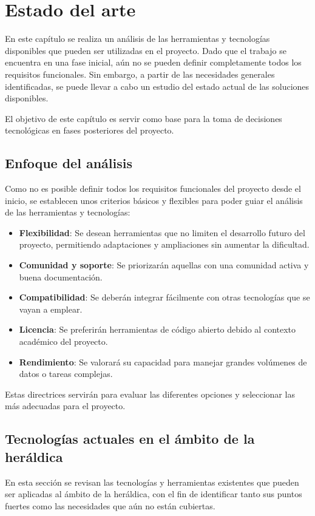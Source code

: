 \chapter{Estado del arte}

En este capítulo se realiza un análisis de las herramientas y tecnologías
disponibles que pueden ser utilizadas en el proyecto. Dado que el trabajo se 
encuentra en una fase inicial, aún no se pueden definir completamente todos
los requisitos funcionales. Sin embargo, a partir de las necesidades
generales identificadas, se puede llevar a cabo un estudio del estado actual
de las soluciones disponibles.

El objetivo de este capítulo es servir como base para la toma de 
decisiones tecnológicas en fases posteriores del proyecto.

\section{Enfoque del análisis}
Como no es posible definir todos los requisitos funcionales del proyecto
desde el inicio, se establecen unos criterios básicos y flexibles para
poder guiar el análisis de las herramientas y tecnologías:

\begin{itemize}
    \item \textbf{Flexibilidad}: Se desean herramientas que no limiten el desarrollo
    futuro del proyecto, permitiendo adaptaciones y ampliaciones sin aumentar la dificultad.
    \item \textbf{Comunidad y soporte}: Se priorizarán aquellas con una comunidad activa
    y buena documentación.
    \item \textbf{Compatibilidad}: Se deberán integrar fácilmente con otras tecnologías
    que se vayan a emplear.
    \item \textbf{Licencia}: Se preferirán herramientas de código abierto debido al
    contexto académico del proyecto.
    \item \textbf{Rendimiento}: Se valorará su capacidad para manejar grandes volúmenes
    de datos o tareas complejas.
\end{itemize}

Estas directrices servirán para evaluar las diferentes opciones y seleccionar las más 
adecuadas para el proyecto.

\section{Tecnologías actuales en el ámbito de la heráldica}
En esta sección se revisan las tecnologías y herramientas existentes que pueden ser
aplicadas al ámbito de la heráldica, con el fin de identificar tanto sus puntos fuertes
como las necesidades que aún no están cubiertas.

